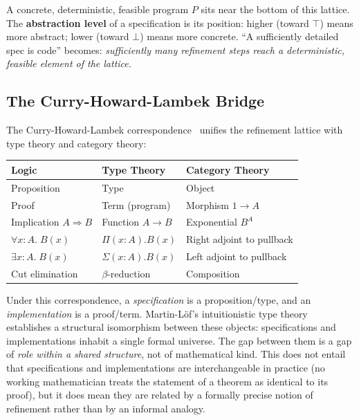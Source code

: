 \documentclass[11pt, a4paper, logo, copyright]{googledeepmind}
\begin{document}
A concrete, deterministic, feasible program $P$ sits near the bottom of this lattice. The \textbf{abstraction level} of a specification is its position: higher (toward $\top$) means more abstract; lower (toward $\bot$) means more concrete. ``A sufficiently detailed spec is code'' becomes: \emph{sufficiently many refinement steps reach a deterministic, feasible element of the lattice.}

\subsection{The Curry-Howard-Lambek Bridge}

The Curry-Howard-Lambek correspondence~\citep{martinlof1979constructive, wadler2015propositions, lambek1986higher} unifies the refinement lattice with type theory and category theory:

\begin{center}
\begin{tabular}{lll}
\toprule
\textbf{Logic} & \textbf{Type Theory} & \textbf{Category Theory} \\
\midrule
Proposition & Type & Object \\
Proof & Term (program) & Morphism $1 \to A$ \\
Implication $A \Rightarrow B$ & Function $A \to B$ & Exponential $B^A$ \\
$\forall x{:}A.\; B(x)$ & $\Pi(x{:}A).B(x)$ & Right adjoint to pullback \\
$\exists x{:}A.\; B(x)$ & $\Sigma(x{:}A).B(x)$ & Left adjoint to pullback \\
Cut elimination & $\beta$-reduction & Composition \\
\bottomrule
\end{tabular}
\end{center}

Under this correspondence, a \emph{specification} is a proposition/type, and an \emph{implementation} is a proof/term. Martin-L\"{o}f's intuitionistic type theory~\citep{martinlof1979constructive} establishes a structural isomorphism between these objects: specifications and implementations inhabit a single formal universe. The gap between them is a gap of \emph{role within a shared structure}, not of mathematical kind. This does not entail that specifications and implementations are interchangeable in practice (no working mathematician treats the statement of a theorem as identical to its proof), but it does mean they are related by a formally precise notion of refinement rather than by an informal analogy.
\end{document}
